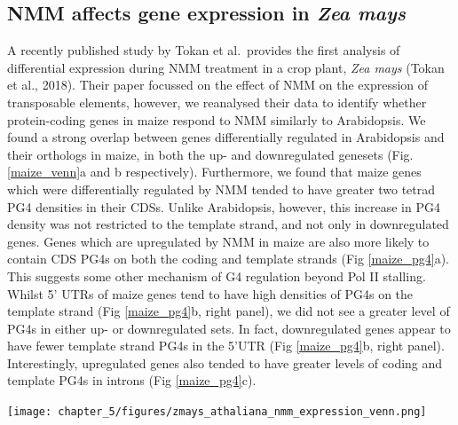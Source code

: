 \documentclass[12pt,a4paper,]{report}
\let\origfigure=\figure
\let\endorigfigure=\endfigure
\renewenvironment{figure}[1][2] {
    \expandafter\origfigure\expandafter[H]
} {
    \endorigfigure
}
\begin{document}
\newpage

\hypertarget{nmm-affects-gene-expression-in-zea-mays}{%
\subsection{\texorpdfstring{NMM affects gene expression in \emph{Zea
mays}}{NMM affects gene expression in Zea mays}}\label{nmm-affects-gene-expression-in-zea-mays}}

A recently published study by Tokan et al.~provides the first analysis
of differential expression during NMM treatment in a crop plant,
\emph{Zea mays} (Tokan et al., 2018). Their paper focussed on the effect
of NMM on the expression of transposable elements, however, we
reanalysed their data to identify whether protein-coding genes in maize
respond to NMM similarly to Arabidopsis. We found a strong overlap
between genes differentially regulated in Arabidopsis and their
orthologs in maize, in both the up- and downregulated genesets (Fig.
\ref{maize_venn}a and b respectively). Furthermore, we found that maize
genes which were differentially regulated by NMM tended to have greater
two tetrad PG4 densities in their CDSs. Unlike Arabidopsis, however,
this increase in PG4 density was not restricted to the template strand,
and not only in downregulated genes. Genes which are upregulated by NMM
in maize are also more likely to contain CDS PG4s on both the coding and
template strands (Fig \ref{maize_pg4}a). This suggests some other
mechanism of G4 regulation beyond Pol II stalling. Whilst 5' UTRs of
maize genes tend to have high densities of PG4s on the template strand
(Fig \ref{maize_pg4}b, right panel), we did not see a greater level of
PG4s in either up- or downregulated sets. In fact, downregulated genes
appear to have fewer template strand PG4s in the 5'UTR (Fig
\ref{maize_pg4}b, right panel). Interestingly, upregulated genes also
tended to have greater levels of coding and template PG4s in introns
(Fig \ref{maize_pg4}c).

\newpage

\begin{figure}[htbp]
\centering
\texttt{[image: chapter\_5/figures/zmays\_athaliana\_nmm\_expression\_venn.png]}
\caption[NMM expression change of Arabidopsis and \textit{Zea mays} orthologs]{\textbf{NMM   expression   change   of   Arabidopsis   and   \textit{Zea   mays}   orthologs}   Venn   diagrams   showing   the   overlap   between   the   set   of   genes   \textbf{a)}   upregulated   and   \textbf{b)}   downregulated   by   NMM   in   Arabidopsis   and   the   unique   set   of   Arabidopsis   orthologs   for   \textit{Z.   mays}   genes   regulated   by   NMM.   P   values   were   calculated   by   hypergeometric   test   compared   to   the   unique   set   of   \textit{Arabidopsis}   genes   with   at   least   one   \textit{Z.   mays}   ortholog.   \label{maize_venn}}
\end{figure}
\end{document}
